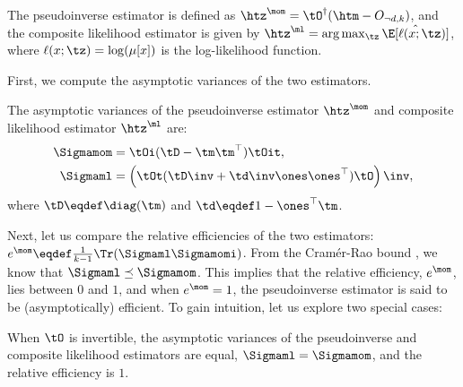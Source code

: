 The pseudoinverse estimator is defined as $\htz^\mom = \tO^\dagger (\htm - O_{\neg d, k})$, and the composite likelihood estimator is given by $\htz^\ml = \arg\max_{\tz} \hat\E[\ell(x; \tz)]$,
where $\ell(x; \tz) = \log(\mu[x])$ is the log-likelihood function.


First, we compute the asymptotic variances of the two estimators.
\begin{lemma}
  \label{lem:mom-pw-variance}
  The asymptotic variances of the pseudoinverse estimator $\htz^\mom$
  and composite likelihood estimator $\htz^\ml$ are:
  \begin{align*}
    \Sigmamom 
      &= \tOi (\tD - \tm \tm^\top) \tOit, \\
    \Sigmaml 
      &=
      \left( \tOt (\tD\inv + \td\inv \ones\ones^\top) \tO \right)\inv,
  \end{align*}
  where $\tD \eqdef \diag(\tm)$ and $\td \eqdef 1 - \ones^\top\tm$.
\end{lemma}

Next, let us compare the relative efficiencies of the two estimators:
$e^\mom \eqdef \frac{1}{k-1} \Tr(\Sigmaml
\Sigmamomi)$. 
From the Cram\'{e}r-Rao bound \cite{vaart98asymptotic}, we know that
$\Sigmaml \preceq \Sigmamom$. This implies that the relative efficiency,
$e^\mom$, lies between $0$ and $1$, and when $e^\mom = 1$, the
pseudoinverse estimator is said to be (asymptotically) efficient.  
To gain intuition, let us explore two special cases:
\begin{lemma}
  When $\tO$ is invertible, the asymptotic variances of the
  pseudoinverse and composite likelihood estimators are equal, $\Sigmaml
  = \Sigmamom$, and the relative efficiency is $1$.
\end{lemma}

